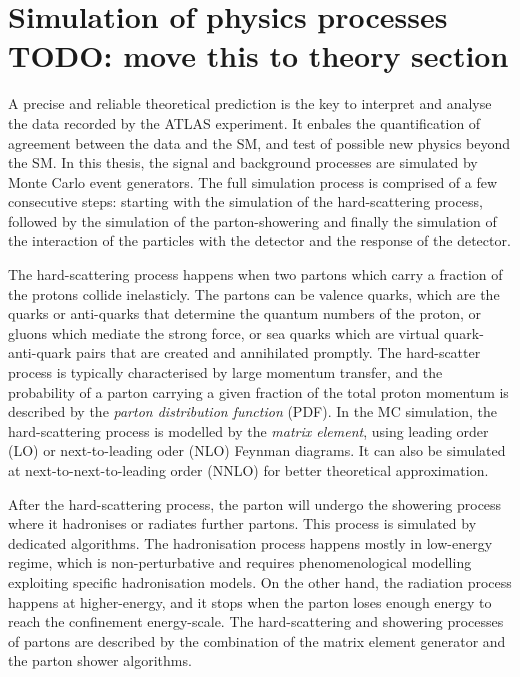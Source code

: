 \label{sec:DiHiggs:samples}



\section{Simulation of physics processes TODO: move this to theory section }
\label{sec:Simulation of physics processes}

A precise and reliable theoretical prediction is the key
to interpret and analyse the data recorded by the ATLAS experiment. 
It enbales the quantification of agreement between the data and the SM, 
and test of possible new physics beyond the SM. 
In this thesis, the signal and background processes are
simulated by Monte Carlo event generators.
The full simulation process is comprised of a few consecutive steps:
starting with the simulation of the hard-scattering process, 
followed by the simulation 
of the parton-showering and finally the simulation of 
the interaction of the particles with the detector and the 
response of the detector. 

The hard-scattering process happens when two partons which carry
a fraction of the protons collide inelasticly. 
The partons can be valence quarks, which are the quarks or anti-quarks
that determine the quantum numbers of the proton, or gluons 
which mediate the strong force, or sea quarks which are virtual 
quark-anti-quark pairs that are created and annihilated promptly. 
The hard-scatter process is typically characterised by large momentum 
transfer, 
and the probability of a parton carrying a given fraction of the total proton
momentum is described by the \textit{parton distribution function} (PDF).
In the MC simulation, the hard-scattering process is modelled by the
\textit{matrix element}, using leading order (LO) or next-to-leading oder (NLO)
Feynman diagrams. It can also be simulated at next-to-next-to-leading order (NNLO)
for better theoretical approximation. 

After the hard-scattering process, the parton will undergo the
showering process where it hadronises or radiates
further partons.
This process is simulated by dedicated algorithms. 
The hadronisation process happens mostly in low-energy regime,
which is non-perturbative and requires phenomenological modelling
exploiting specific hadronisation models. 
On the other hand, the radiation process happens at higher-energy, 
and it stops when the parton loses enough energy to reach the
confinement energy-scale.
The hard-scattering and showering processes of partons are 
described by the combination of the matrix element generator
and the parton shower algorithms. 

